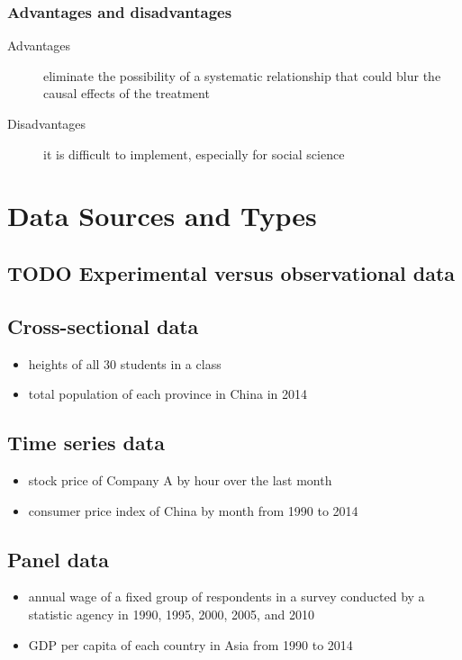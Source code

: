 \documentclass[a4paper,11pt]{article}
\begin{document}
\subsubsection*{Advantages and disadvantages}
\label{sec:org68a14b0}

\begin{description}
\item[{Advantages}] eliminate the possibility of a systematic relationship that could
blur the causal effects of the treatment

\item[{Disadvantages}] it is difficult to implement, especially for social
science
\end{description}


\section{Data Sources and Types}
\label{sec:orgc3aaa37}
\subsection{{\bfseries\sffamily TODO} Experimental versus observational data}
\label{sec:orgbbf3f79}

\subsection{Cross-sectional data}
\label{sec:orgab41fc0}

\begin{itemize}
\item heights of all 30 students in a class

\item total population of each province in China in 2014
\end{itemize}

\subsection{Time series data}
\label{sec:org2862fae}

\begin{itemize}
\item stock price of Company A by hour over the last month

\item consumer price index of China by month from 1990 to 2014
\end{itemize}

\subsection{Panel data}
\label{sec:org47a24b8}

\begin{itemize}
\item annual wage of a fixed group of respondents in a survey conducted by
a statistic agency in 1990, 1995, 2000, 2005, and 2010

\item GDP per capita of each country in Asia from 1990 to 2014
\end{itemize}
\end{document}
